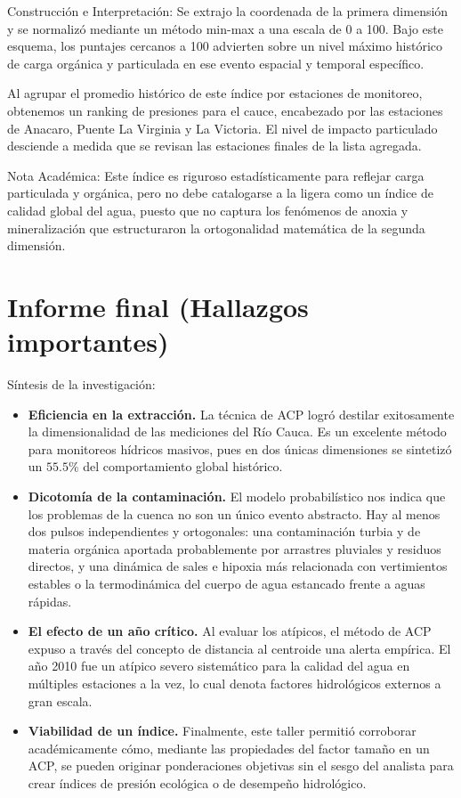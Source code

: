 \documentclass{article} %
\begin{document}
Construcción e Interpretación: Se extrajo la coordenada de la primera dimensión y se normalizó mediante un método min-max a una escala de 0 a 100. Bajo este esquema, los puntajes cercanos a 100 advierten sobre un nivel máximo histórico de carga orgánica y particulada en ese evento espacial y temporal específico.

Al agrupar el promedio histórico de este índice por estaciones de monitoreo, obtenemos un ranking de presiones para el cauce, encabezado por las estaciones de Anacaro, Puente La Virginia y La Victoria. El nivel de impacto particulado desciende a medida que se revisan las estaciones finales de la lista agregada.

Nota Académica: Este índice es riguroso estadísticamente para reflejar carga particulada y orgánica, pero no debe catalogarse a la ligera como un índice de calidad global del agua, puesto que no captura los fenómenos de anoxia y mineralización que estructuraron la ortogonalidad matemática de la segunda dimensión.

\section{Informe final (Hallazgos importantes)}
Síntesis de la investigación:

\begin{itemize}
    \item \textbf{Eficiencia en la extracción.} La técnica de ACP logró destilar exitosamente la dimensionalidad de las mediciones del Río Cauca. Es un excelente método para monitoreos hídricos masivos, pues en dos únicas dimensiones se sintetizó un $55.5\%$ del comportamiento global histórico.
    \item \textbf{Dicotomía de la contaminación.} El modelo probabilístico nos indica que los problemas de la cuenca no son un único evento abstracto. Hay al menos dos pulsos independientes y ortogonales: una contaminación turbia y de materia orgánica aportada probablemente por arrastres pluviales y residuos directos, y una dinámica de sales e hipoxia más relacionada con vertimientos estables o la termodinámica del cuerpo de agua estancado frente a aguas rápidas.
    \item \textbf{El efecto de un año crítico.} Al evaluar los atípicos, el método de ACP expuso a través del concepto de distancia al centroide una alerta empírica. El año 2010 fue un atípico severo sistemático para la calidad del agua en múltiples estaciones a la vez, lo cual denota factores hidrológicos externos a gran escala.
    \item \textbf{Viabilidad de un índice.} Finalmente, este taller permitió corroborar académicamente cómo, mediante las propiedades del factor tamaño en un ACP, se pueden originar ponderaciones objetivas sin el sesgo del analista para crear índices de presión ecológica o de desempeño hidrológico.
\end{itemize}
\end{document}
